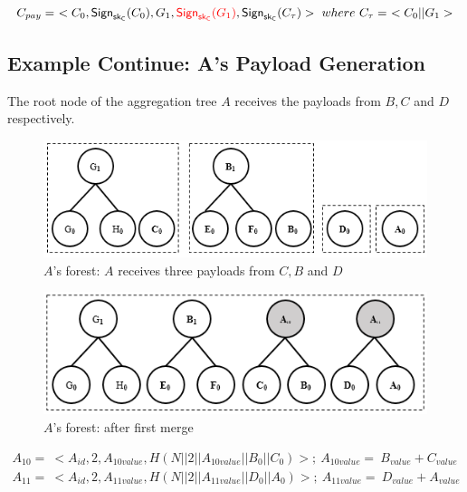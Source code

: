 \documentclass[%
  slidesonly,%
  semlayer%
  ]{seminar}                                  %
\newcommand{\sk}{\sf{sk}}
\begin{document}
\begin{slide}
      \begin{equation*}
        \begin{array}{l}
          C_{pay} =\ <C_{0},\textsf{Sign}_{\sk_{C}}(C_{0}),G_{1},\textcolor{red}{\textsf{Sign}_{\sk_{C}}(G_{1})}, \textsf{Sign}_{\sk_{C}}(C_{\tau})>\ where\ C_{\tau} =\ <C_{0} || G_{1}>\\
        \end{array}
      \end{equation*}

      \clearpage

    \subsection*{Example Continue: A's Payload Generation}  

      The root node of the aggregation tree $A$ receives the payloads from $B,C$ and $D$ respectively.
      
      \begin{figure}[h!]
        \centering
        \includegraphics[scale = 0.5]{images/a-forest.png}
        \caption{$A$'s forest: $A$ receives three payloads from $C,B$ and $D$}
        \label{fig:a-forest}
      \end{figure}
      \clearpage

      \begin{figure}[h!]
        \centering
        \includegraphics[scale = 0.5]{images/a-forest-first-merge.png}
        \caption{$A$'s forest: after first merge}
        \label{fig:a-forest-first-merge}
      \end{figure}
      \begin{equation*}
        \begin{array}{l}
          A_{10} =\ <A_{id},2,A_{10value},H(N||2||A_{10value}||B_{0}||C_{0})>;\ A_{10value} =\ B_{value} + C_{value}\\
          A_{11} =\ <A_{id},2,A_{11value},H(N||2||A_{11value}||D_{0}||A_{0})>;\ A_{11value} =\ D_{value} + A_{value}\\
        \end{array}     
      \end{equation*}


\end{slide}
\end{document}
